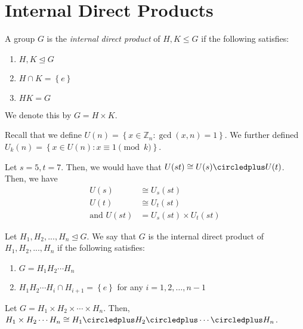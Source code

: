 \section{Internal Direct Products}

\begin{definition}
    A group \(G\) is the \textit{internal direct product} of \(H, K \leq G\) if the following satisfies:
    \begin{enumerate}
        \item \(H, K \unlhd G\)
        \item \(H \cap K = \left\{e\right\}\)
        \item \(HK = G\)
    \end{enumerate}
    We denote this by \(G = H \times K\).
\end{definition}

\begin{nexample}
    Recall that we define \(U(n) = \left\{x \in \mathbb{Z}_n : \gcd(x, n) = 1\right\}\). We further defined \(U_k(n) = \left\{{x} \in U(n) : x \equiv 1 \pmod k\right\}\).

    Let \(s = 5, t = 7\). Then, we would have that \(U(st) \cong U(s) \circledplus U(t)\). Then, we have
    \[
    \begin{aligned}
        U(s) &\cong U_s(st) \\
        U(t) &\cong U_t(st) \\
        \text{and } U(st) &= U_s(st) \times U_t(st)
    \end{aligned}
    \]
\end{nexample}

\begin{definition}
    Let \(H_1, H_2, ..., H_n \unlhd G\). We say that \(G\) is the internal direct product of \(H_1, H_2, ..., H_n\) if the following satisfies:
    \begin{enumerate}
        \item \(G = H_1 H_2 \cdots H_n\)
        \item \(H_1 H_2 \cdots H_i \cap H_{i+1} = \left\{e\right\}\) for any \(i = 1, 2, \ldots, n-1\)
    \end{enumerate}
\end{definition}

\begin{theorem}
    Let \(G = H_1 \times H_2 \times \cdots \times H_n\). Then, \(H_1 \times H_2 \cdots H_n \cong H_1 \circledplus H_2 \circledplus \cdots \circledplus H_n\).
\end{theorem}

